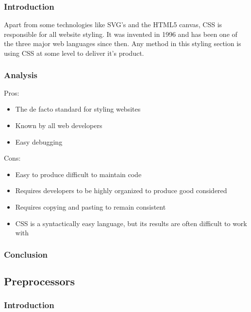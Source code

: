 \documentclass[draftclsnofoot,onecolumn,letterpaper,10pt,compsoc]{IEEEtran}
\begin{document}
    \subsubsection{Introduction}

    Apart from some technologies like SVG's and the HTML5 canvas, CSS is responsible for all website styling.
    It was invented in 1996 and has been one of the three major web languages since then.
    Any method in this styling section is using CSS at some level to deliver it's product.

    \subsubsection{Analysis}
    Pros:
    \begin{itemize}
      \item The de facto standard for styling websites
      \item Known by all web developers
      \item Easy debugging
    \end{itemize}

    Cons:
    \begin{itemize}
      \item Easy to produce difficult to maintain code
      \item Requires developers to be highly organized to produce good considered
      \item Requires copying and pasting to remain consistent
      \item CSS is a syntactically easy language, but its results are often difficult to work with
    \end{itemize}

    \subsubsection{Conclusion}

  \subsection{Preprocessors}
    \subsubsection{Introduction}
\end{document}
